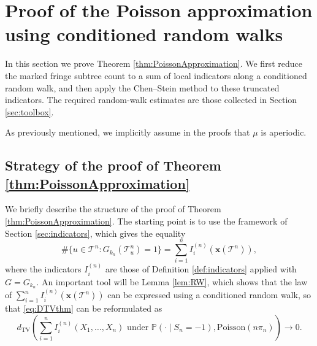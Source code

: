 \documentclass[a4paper,11pt]{article}
\DeclareRobustCommand{\P}{\mathbb{P}}
\DeclareRobustCommand{\1}{\mathbf{1}}
\newcommand{\dTV}{d_{\mathrm{TV}}}
\newcommand{\Po}{\mathrm{Poisson}}
\begin{document}
 \section{Proof of the Poisson approximation using conditioned random walks}
\label{sec:proofapprox}


In this section we prove Theorem \ref{thm:PoissonApproximation}. We first
reduce the marked fringe subtree count to a sum of local indicators along a
conditioned random walk, and then apply the Chen--Stein method to these
truncated indicators. The required random-walk estimates are those collected
in Section \ref{sec:toolbox}.

As previously mentioned, we implicitly assume in the proofs that $\mu$ is aperiodic.




\subsection{Strategy of the proof of Theorem \ref{thm:PoissonApproximation}}



We briefly describe the structure of the proof of Theorem \ref{thm:PoissonApproximation}. The starting point is to use the framework of Section \ref{sec:indicators}, which gives the equality
$$\# \{u \in \mathcal{T}^{n} : G_{k_{n}}( \mathcal{T}^{n}_{u})=1\}=\sum_{i=1}^{n} I^{(n)}_{i}(\mathbf{x}( \mathcal{T}^{n})),$$
where the indicators $I_i^{(n)}$ are those of Definition
\ref{def:indicators} applied with $G=G_{k_n}$. An important tool will be Lemma \ref{lem:RW}, which shows that  the law of $\sum_{i=1}^{n} I^{(n)}_{i}(\mathbf{x}( \mathcal{T}^{n}))$ can be expressed using a conditioned random walk, so that \eqref{eq:DTVthm} can be reformulated as
\begin{equation}
\label{eq:DTVthm2}
\dTV \left(
\sum_{i=1}^{n} I^{(n)}_{i}(X_{1}, \ldots,X_{n})
\textrm{ under } \P(\cdot\mid S_n=-1),
\Po(n\pi_n)
\right)
\longrightarrow0.
\end{equation}
\end{document}
